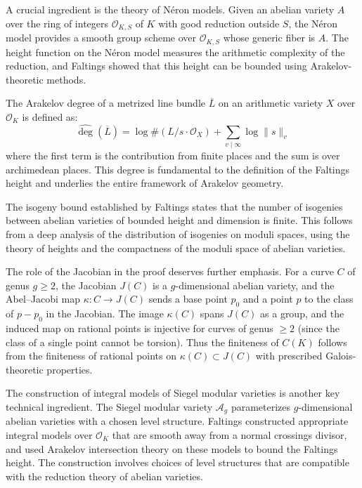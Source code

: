 A crucial ingredient is the theory of N\'eron models. Given an abelian variety $A$ over the ring of integers $\mathcal{O}_{K,S}$ of $K$ with good reduction outside $S$, the N\'eron model provides a smooth group scheme over $\mathcal{O}_{K,S}$ whose generic fiber is $A$. The height function on the N\'eron model measures the arithmetic complexity of the reduction, and Faltings showed that this height can be bounded using Arakelov-theoretic methods.

The Arakelov degree of a metrized line bundle $\overline{L}$ on an arithmetic variety $X$ over $\mathcal{O}_K$ is defined as:
\[
\widehat{\deg}(\overline{L}) = \log \#(L / s \cdot \mathcal{O}_X) + \sum_{v \mid \infty} \log \|s\|_v
\]
where the first term is the contribution from finite places and the sum is over archimedean places. This degree is fundamental to the definition of the Faltings height and underlies the entire framework of Arakelov geometry.

The isogeny bound established by Faltings states that the number of isogenies between abelian varieties of bounded height and dimension is finite. This follows from a deep analysis of the distribution of isogenies on moduli spaces, using the theory of heights and the compactness of the moduli space of abelian varieties.

The role of the Jacobian in the proof deserves further emphasis. For a curve $C$ of genus $g \geq 2$, the Jacobian $J(C)$ is a $g$-dimensional abelian variety, and the Abel--Jacobi map $\kappa: C \to J(C)$ sends a base point $p_0$ and a point $p$ to the class of $p - p_0$ in the Jacobian. The image $\kappa(C)$ spans $J(C)$ as a group, and the induced map on rational points is injective for curves of genus $\geq 2$ (since the class of a single point cannot be torsion). Thus the finiteness of $C(K)$ follows from the finiteness of rational points on $\kappa(C) \subset J(C)$ with prescribed Galois-theoretic properties.

The construction of integral models of Siegel modular varieties is another key technical ingredient. The Siegel modular variety $\mathcal{A}_g$ parameterizes $g$-dimensional abelian varieties with a chosen level structure. Faltings constructed appropriate integral models over $\mathcal{O}_K$ that are smooth away from a normal crossings divisor, and used Arakelov intersection theory on these models to bound the Faltings height. The construction involves choices of level structures that are compatible with the reduction theory of abelian varieties.

